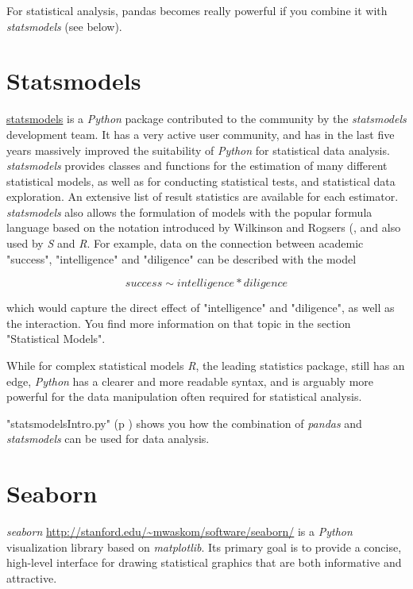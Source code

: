 For statistical analysis, pandas becomes really powerful if you combine it with \emph{statsmodels} (see below).

\section{Statsmodels}

\href{http://statsmodels.sourceforge.net/.}{statsmodels} is a \emph{Python} package contributed to the community by the \emph{statsmodels} development team. It has a very active user community, and has in the last five years massively improved the suitability of \emph{Python} for statistical data analysis. \emph{statsmodels} provides classes and functions for the estimation of many different statistical models, as well as for conducting statistical tests, and statistical data exploration. An extensive list of result statistics are available for each estimator. \emph{statsmodels} also allows the formulation of models with the popular formula language based on the notation introduced by Wilkinson and Rogsers (\cite{Wilkinson1973}, and also used by \emph{S} and \emph{R}. For example, data on the connection between academic "success", "intelligence" and "diligence" can be described with the model

\begin{equation*}
    success \sim intelligence * diligence
\end{equation*}

which would capture the direct effect of "intelligence" and "diligence", as well as the interaction. You find more information on that topic in the section "Statistical Models".

While for complex statistical models \emph{R}, the leading statistics package, still has an edge, \emph{Python} has a clearer and more readable syntax, and is arguably more powerful for the data manipulation often required for statistical analysis.

\PyImg "statsmodelsIntro.py" (p \pageref{py:statsmodelsIntro}) shows you how the combination of \emph{pandas} and \emph{statsmodels} can be used for data analysis.

\section{Seaborn}

\emph{seaborn} \url{http://stanford.edu/~mwaskom/software/seaborn/} is a \emph{Python} visualization library based on \emph{matplotlib}. Its primary goal is to provide a concise, high-level interface for drawing statistical graphics that are both informative and attractive.

